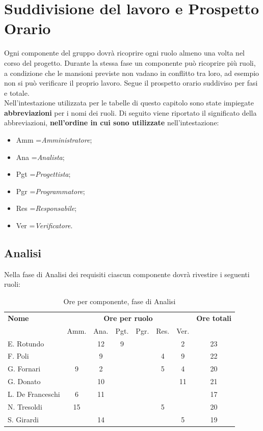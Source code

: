 \section{Suddivisione del lavoro e Prospetto Orario} 


Ogni componente del gruppo dovrà ricoprire ogni ruolo almeno una volta nel corso del progetto.
Durante la stessa fase un componente può ricoprire più ruoli, a condizione che le mansioni previste non vadano in conflitto tra loro, ad esempio non si può verificare il proprio lavoro.
Segue il prospetto orario suddiviso per fasi e totale. \\

Nell'intestazione utilizzata per le tabelle di questo capitolo sono state impiegate \textbf{abbreviazioni} per i nomi dei ruoli.
Di seguito viene riportato il significato della abbreviazioni, \textbf{nell'ordine in cui sono utilizzate} nell'intestazione:
\begin{itemize}
\item Amm =\textit{Amministratore};
\item Ana =\textit{Analista};
\item Pgt =\textit{Progettista};
\item Pgr =\textit{Programmatore};
\item Res =\textit{Responsabile};
\item Ver =\textit{Verificatore}.
\end{itemize}
\subsection{Analisi}

Nella fase di Analisi dei requisiti ciascun componente dovrà rivestire i seguenti ruoli:
\noindent
\begin{table}[H]
\begin{tabular}{lccccccc}
\toprule
    \textbf{Nome}  & \multicolumn{6}{c}{\textbf{Ore per ruolo}} & \textbf{Ore totali} \\
     & Amm. & Ana. & Pgt. & Pgr. & Res. & Ver. \\
    \midrule
    E. Rotundo 		&   & 12 & 9 &  &  & 2 & 23 \\
    F. Poli 		&   & 9 &  &  & 4 & 9 & 22 \\
    G. Fornari		& 9 & 2 & 	&  & 5 & 4 & 20 \\
    G. Donato 		&   & 10 &  &  &  & 11 & 21 \\
    L. De Franceschi  & 6 & 11 &  &  &  &  & 17 \\
    N. Tresoldi 		& 15&  &  &  & 5 &  & 20 \\
   	S. Girardi 		&   & 14 &  &  &  & 5 & 19 \\
    
    \bottomrule
\end{tabular}
\caption{Ore per componente, fase di Analisi}
\end{table}

